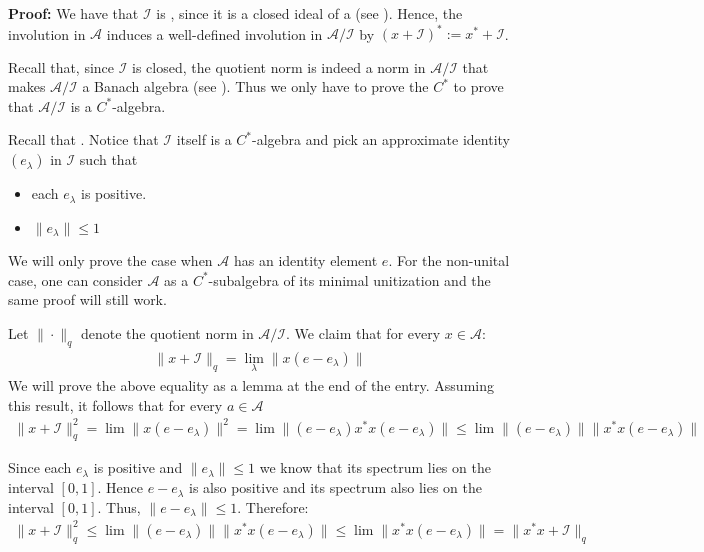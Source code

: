 \documentclass[12pt]{article}
\begin{document}

{\bf Proof:} We have that $\mathcal{I}$ is , since it is a closed ideal of a  (see ). Hence, the involution in $\mathcal{A}$ induces a well-defined involution in $\mathcal{A}/\mathcal{I}$ by $(x+\mathcal{I})^*:=x^*+\mathcal{I}$.

Recall that, since $\mathcal{I}$ is closed, the quotient norm is indeed a norm in $\mathcal{A}/\mathcal{I}$ that makes $\mathcal{A}/\mathcal{I}$ a Banach algebra (see ). Thus we only have to prove the $C^*$  to prove that $\mathcal{A}/\mathcal{I}$ is a $C^*$-algebra.

Recall that . Notice that $\mathcal{I}$ itself is a $C^*$-algebra and pick an approximate identity $(e_{\lambda})$ in $\mathcal{I}$ such that
\begin{itemize}
\item each $e_{\lambda}$ is positive.
\item $\|e_{\lambda}\|\leq 1$
\end{itemize}

We will only prove the case when $\mathcal{A}$ has an identity element $e$. For the non-unital case, one can consider $\mathcal{A}$ as a $C^*$-subalgebra of its minimal unitization and the same proof will still work.

Let $\|\cdot\|_{q}$ denote the quotient norm in $\mathcal{A}/\mathcal{I}$. We claim that for every $x \in \mathcal{A}$:
\begin{align}
\|x + \mathcal{I}\|_q = \lim_{\lambda}\|x(e-e_{\lambda})\|
\end{align}
We will prove the above equality as a lemma at the end of the entry. Assuming this result, it follows that for every $a \in \mathcal{A}$
\begin{align*}
\|x+\mathcal{I}\|_q^2 = \lim \|x(e-e_{\lambda})\|^2 = \lim \|(e-e_{\lambda})x^*x(e-e_{\lambda})\| \leq \lim \|(e-e_{\lambda})\|\|x^*x(e-e_{\lambda})\|
\end{align*}

Since each $e_{\lambda}$ is positive and $\|e_{\lambda}\|\leq 1$ we know that its spectrum lies on the interval $[0,1]$. Hence $e-e_{\lambda}$ is also positive and its spectrum also lies on the interval $[0,1]$. Thus, $\|e-e_{\lambda}\|\leq 1$. Therefore:
\begin{align*}
\|x+\mathcal{I}\|_q^2 \leq \lim \|(e-e_{\lambda})\|\|x^*x(e-e_{\lambda})\| \leq \lim \|x^*x(e-e_{\lambda})\| = \|x^*x+\mathcal{I}\|_q
\end{align*}
\end{document}
